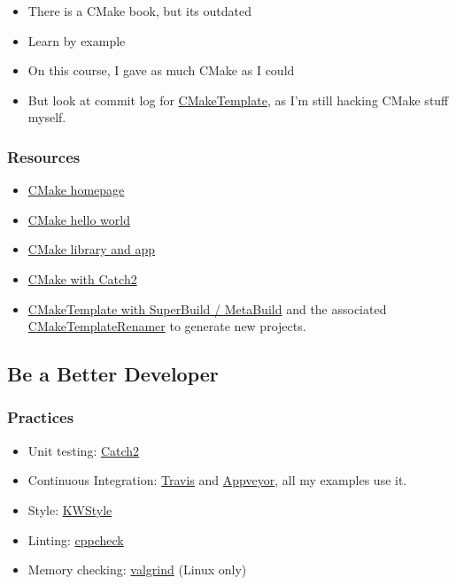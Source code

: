 \begin{itemize}
\itemsep1pt\parskip0pt
\item
  There is a CMake book, but its outdated
\item
  Learn by example
\item
  On this course, I gave as much CMake as I could
\item
  But look at commit log for
  \href{https://github.com/MattClarkson/CMakeCatchTemplate}{CMakeTemplate},
  as I'm still hacking CMake stuff myself.
\end{itemize}

\subsubsection{Resources}\label{resources}

\begin{itemize}
\itemsep1pt\parskip0pt
\item
  \href{https://cmake.org/}{CMake homepage}
\item
  \href{https://github.com/MattClarkson/CMakeHelloWorld}{CMake hello
  world}
\item
  \href{https://github.com/MattClarkson/CMakeLibraryAndApp}{CMake
  library and app}
\item
  \href{https://github.com/MattClarkson/CMakeCatch2}{CMake with Catch2}
\item
  \href{https://github.com/MattClarkson/CMakeCatchTemplate}{CMakeTemplate
  with SuperBuild / MetaBuild} and the associated
  \href{https://github.com/MattClarkson/CMakeTemplateRenamer}{CMakeTemplateRenamer}
  to generate new projects.
\end{itemize}

\subsection{Be a Better Developer}\label{be-a-better-developer}

\subsubsection{Practices}\label{practices}

\begin{itemize}
\itemsep1pt\parskip0pt
\item
  Unit testing: \href{https://github.com/catchorg/Catch2}{Catch2}
\item
  Continuous Integration: \href{https://travis-ci.com/}{Travis} and
  \href{https://www.appveyor.com/}{Appveyor}, all my examples use it.
\item
  Style: \href{https://kitware.github.io/KWStyle/}{KWStyle}
\item
  Linting: \href{http://cppcheck.sourceforge.net/}{cppcheck}
\item
  Memory checking: \href{http://valgrind.org/}{valgrind} (Linux only)
\end{itemize}

